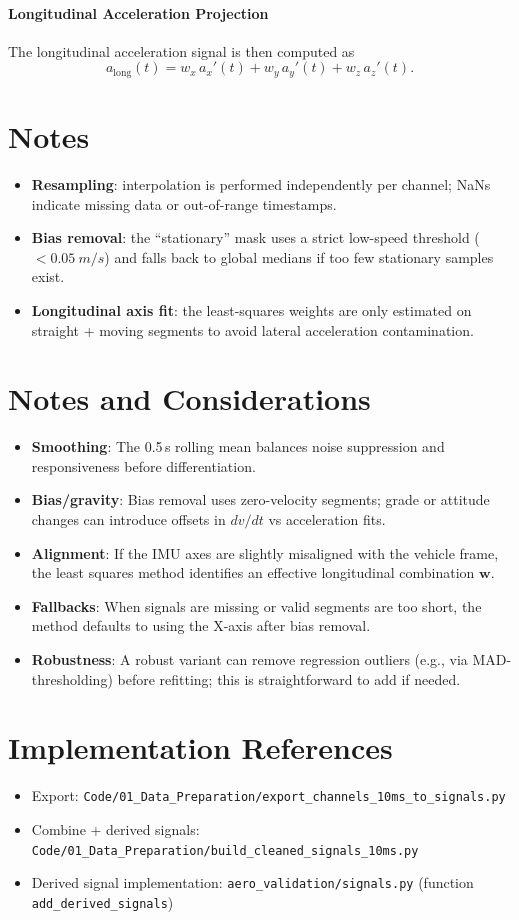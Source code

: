 \documentclass[11pt,a4paper]{article}
\begin{document}
\paragraph{Longitudinal Acceleration Projection}
The longitudinal acceleration signal is then computed as
$$ a_\text{long}(t) = w_x\,a_x'(t) + w_y\,a_y'(t) + w_z\,a_z'(t). $$

\section{Notes}
\begin{itemize}
  \item \textbf{Resampling}: interpolation is performed independently per channel; NaNs indicate missing data or out-of-range timestamps.
  \item \textbf{Bias removal}: the ``stationary'' mask uses a strict low-speed threshold ($<\SI{0.05}{m/s}$) and falls back to global medians if too few stationary samples exist.
  \item \textbf{Longitudinal axis fit}: the least-squares weights are only estimated on straight + moving segments to avoid lateral acceleration contamination.
\end{itemize}

\section{Notes and Considerations}
\begin{itemize}
  \item \textbf{Smoothing}: The 0.5\,s rolling mean balances noise suppression and responsiveness before differentiation.
  \item \textbf{Bias/gravity}: Bias removal uses zero-velocity segments; grade or attitude changes can introduce offsets in $dv/dt$ vs acceleration fits.
  \item \textbf{Alignment}: If the IMU axes are slightly misaligned with the vehicle frame, the least squares method identifies an effective longitudinal combination $\mathbf{w}$.
  \item \textbf{Fallbacks}: When signals are missing or valid segments are too short, the method defaults to using the X-axis after bias removal.
  \item \textbf{Robustness}: A robust variant can remove regression outliers (e.g., via MAD-thresholding) before refitting; this is straightforward to add if needed.
\end{itemize}

\section{Implementation References}
\begin{itemize}
  \item Export: \texttt{Code/01\_Data\_Preparation/export\_channels\_10ms\_to\_signals.py}
  \item Combine + derived signals: \texttt{Code/01\_Data\_Preparation/build\_cleaned\_signals\_10ms.py}
  \item Derived signal implementation: \texttt{aero\_validation/signals.py} (function \texttt{add\_derived\_signals})
\end{itemize}
\end{document}
